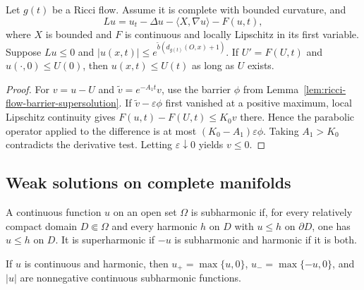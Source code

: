 \begin{theorem}
\label{thm:noncompact-scalar-pde-ode-comparison}

Let $g(t)$ be a Ricci flow.  Assume it is complete with bounded curvature, and
\[
Lu=u_t-\Delta u-\langle X,\nabla u\rangle-F(u,t),
\]
where $X$ is bounded and $F$ is continuous and locally Lipschitz in its first
variable.  Suppose $Lu\leq0$ and
$|u(x,t)|\leq e^{\widetilde b(d_{g(t)}(O,x)+1)}$.  If $U'=F(U,t)$ and
$u(\cdot,0)\leq U(0)$, then $u(x,t)\leq U(t)$ as long as $U$ exists.
\end{theorem}

\begin{proof}
\sketch
{}
For $v=u-U$ and $\widetilde v=e^{-A_1t}v$, use the barrier $\phi$ from
Lemma~\ref{lem:ricci-flow-barrier-supersolution}.  If
$\widetilde v-\varepsilon\phi$ first vanished at a positive maximum, local
Lipschitz continuity gives $F(u,t)-F(U,t)\leq K_0v$ there.  Hence the
parabolic operator applied to the difference is at most
$(K_0-A_1)\varepsilon\phi$.  Taking $A_1>K_0$ contradicts the derivative
test.  Letting $\varepsilon\downarrow0$ yields $v\leq0$.
\end{proof}

\subsection{Weak solutions on complete manifolds}

\begin{definition}
\label{def:continuous-subharmonic-function}

A continuous function $u$ on an open set $\Omega$ is subharmonic if, for every
relatively compact domain $D\Subset\Omega$ and every harmonic $h$ on $D$ with
$u\leq h$ on $\partial D$, one has $u\leq h$ on $D$.  It is superharmonic if
$-u$ is subharmonic and harmonic if it is both.
\end{definition}

\begin{lemma}
\label{lem:absolute-value-harmonic-subsolution}

If $u$ is continuous and harmonic, then $u_+=\max\{u,0\}$,
$u_-=\max\{-u,0\}$, and $|u|$ are nonnegative continuous subharmonic
functions.
\end{lemma}

